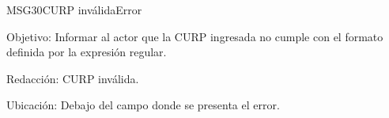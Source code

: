 \begin{mensaje}{MSG30}{CURP inválida}{Error}
	\item [Objetivo:] Informar al actor que la CURP ingresada no cumple con el formato definida por la expresión regular.
	\item[Redacción:] CURP inválida.
	\item [Ubicación:] Debajo del campo donde se presenta el error.
\end{mensaje}